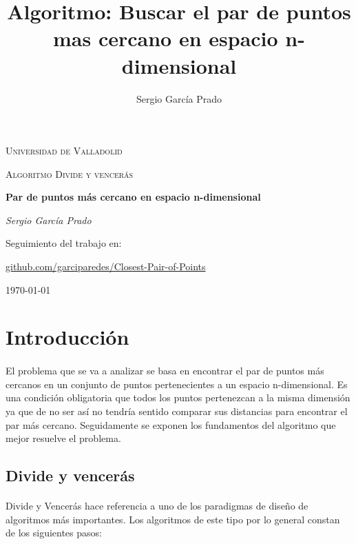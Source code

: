 \documentclass{article}
\title{Algoritmo: Buscar el par de puntos mas cercano en espacio n-dimensional}
\author{Sergio García Prado}
\begin{document}
\begin{titlepage}
	\centering
	{\scshape\LARGE Universidad de Valladolid \par}
	\vspace{1cm}
	{\scshape\Large Algoritmo Divide y vencerás\par}
	\vspace{1.5cm}
	{\huge\bfseries Par de puntos más cercano en espacio n-dimensional\par}
	\vspace{2cm}
	{\Large\itshape Sergio García Prado\par}
	
	\vfill
	Seguimiento del trabajo en: \par
	\href{https://github.com/garciparedes/Closest-Pair-of-Points}{github.com/garciparedes/Closest-Pair-of-Points}

	\vfill


	{\large \today\par}
\end{titlepage}

\section{Introducción}

	\paragraph{}
	El problema que se va a analizar se basa en encontrar el par de puntos más cercanos en un conjunto de puntos pertenecientes a un espacio n-dimensional. Es una condición obligatoria que todos los puntos pertenezcan a la misma dimensión ya que de no ser así no tendría sentido comparar sus distancias para encontrar el par más cercano. Seguidamente se exponen los fundamentos del algoritmo que mejor resuelve el problema.
	
	\subsection{Divide y vencerás}
		
		\paragraph{}
		Divide y Vencerás hace referencia a uno de los paradigmas de diseño de algoritmos más importantes. Los algoritmos de este tipo por lo general constan de los siguientes pasos:
		
\end{document}
